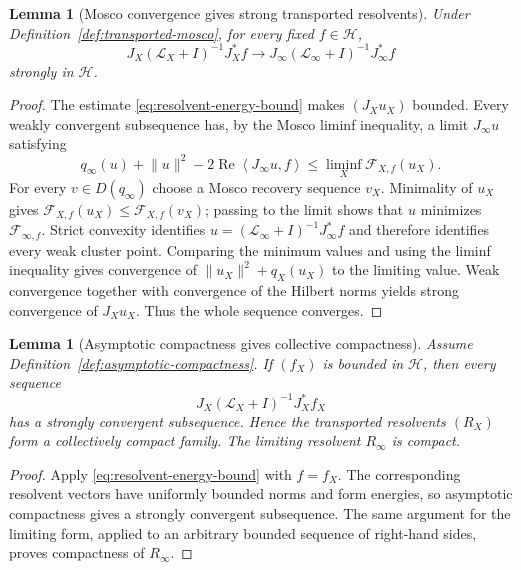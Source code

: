 \documentclass[11pt]{article}
\newtheorem{lemma}[theorem]{Lemma}
\theoremstyle{definition}
\theoremstyle{remark}
\newcommand{\norm}[1]{\lVert#1\rVert}
\newcommand{\ip}[2]{\left\langle#1,#2\right\rangle}
\begin{document}
\begin{lemma}[Mosco convergence gives strong transported resolvents]
\label{lem:mosco-strong-resolvent}
Under Definition~\ref{def:transported-mosco}, for every fixed
$f\in\mathscr H$,
\begin{equation}
J_X(\mathscr L_X+I)^{-1}J_X^*f
\longrightarrow
J_\infty(\mathscr L_\infty+I)^{-1}J_\infty^*f
\label{eq:strong-resolvent}
\end{equation}
strongly in $\mathscr H$.
\end{lemma}

\begin{proof}
The estimate \eqref{eq:resolvent-energy-bound} makes $(J_Xu_X)$ bounded.
Every weakly convergent subsequence has, by the Mosco liminf inequality, a
limit $J_\infty u$ satisfying
\[
q_\infty(u)+\norm u^2-2\operatorname{Re}\ip{J_\infty u}{f}
\le\liminf_X\mathcal F_{X,f}(u_X).
\]
For every $v\in D(q_\infty)$ choose a Mosco recovery sequence $v_X$.
Minimality of $u_X$ gives
$\mathcal F_{X,f}(u_X)\le\mathcal F_{X,f}(v_X)$; passing to the limit shows
that $u$ minimizes $\mathcal F_{\infty,f}$.  Strict convexity identifies
$u=(\mathscr L_\infty+I)^{-1}J_\infty^*f$ and therefore identifies every weak
cluster point.  Comparing the minimum values and using the liminf inequality
gives convergence of $\norm{u_X}^2+q_X(u_X)$ to the limiting value.  Weak
convergence together with convergence of the Hilbert norms yields strong
convergence of $J_Xu_X$.  Thus the whole sequence converges.
\end{proof}

\begin{lemma}[Asymptotic compactness gives collective compactness]
\label{lem:collective-compactness}
Assume Definition~\ref{def:asymptotic-compactness}.  If $(f_X)$ is bounded in
$\mathscr H$, then every sequence
\[
J_X(\mathscr L_X+I)^{-1}J_X^*f_X
\]
has a strongly convergent subsequence.  Hence the transported resolvents
$(R_X)$ form a collectively compact family.  The limiting resolvent $R_\infty$
is compact.
\end{lemma}

\begin{proof}
Apply \eqref{eq:resolvent-energy-bound} with $f=f_X$.  The corresponding
resolvent vectors have uniformly bounded norms and form energies, so
asymptotic compactness gives a strongly convergent subsequence.  The same
argument for the limiting form, applied to an arbitrary bounded sequence of
right-hand sides, proves compactness of $R_\infty$.
\end{proof}
\end{document}
